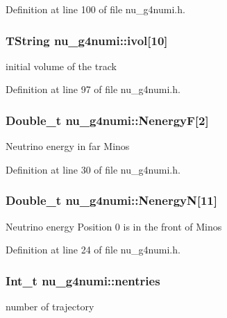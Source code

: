 Definition at line 100 of file nu\-\_\-g4numi.\-h.

\hypertarget{classnu__g4numi_a956cc4ca8c07b803d8b0848101e10742}{
\subsubsection[{ivol}]{\setlength{\rightskip}{0pt plus 5cm}T\-String nu\-\_\-g4numi\-::ivol\mbox{[}10\mbox{]}}}\label{classnu__g4numi_a956cc4ca8c07b803d8b0848101e10742}
initial volume of the track 

Definition at line 97 of file nu\-\_\-g4numi.\-h.

\hypertarget{classnu__g4numi_a47a88316abc9d5c30ba0c98893a441a8}{
\subsubsection[{Nenergy\-F}]{\setlength{\rightskip}{0pt plus 5cm}Double\-\_\-t nu\-\_\-g4numi\-::\-Nenergy\-F\mbox{[}2\mbox{]}}}\label{classnu__g4numi_a47a88316abc9d5c30ba0c98893a441a8}
Neutrino energy in far Minos 

Definition at line 30 of file nu\-\_\-g4numi.\-h.

\hypertarget{classnu__g4numi_a36acd180b72c4686f55974e6783778ad}{
\subsubsection[{Nenergy\-N}]{\setlength{\rightskip}{0pt plus 5cm}Double\-\_\-t nu\-\_\-g4numi\-::\-Nenergy\-N\mbox{[}11\mbox{]}}}\label{classnu__g4numi_a36acd180b72c4686f55974e6783778ad}
Neutrino energy Position 0 is in the front of Minos 

Definition at line 24 of file nu\-\_\-g4numi.\-h.

\hypertarget{classnu__g4numi_a49582e60898463be66b4216b5bbda6eb}{
\subsubsection[{nentries}]{\setlength{\rightskip}{0pt plus 5cm}Int\-\_\-t nu\-\_\-g4numi\-::nentries}}\label{classnu__g4numi_a49582e60898463be66b4216b5bbda6eb}
number of trajectory 

